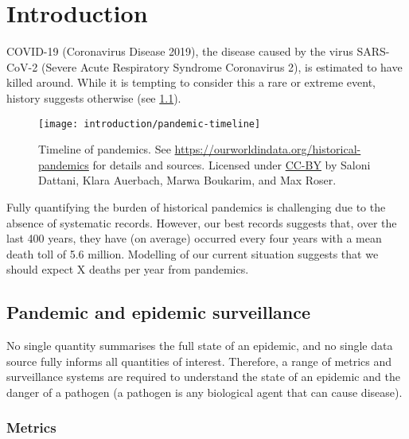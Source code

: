 \documentclass[thesis.tex]{subfiles}
\begin{document}
\chapter{Introduction} \label{intro}

COVID-19 (Coronavirus Disease 2019), the disease caused by the virus SARS-CoV-2 (Severe Acute Respiratory Syndrome Coronavirus 2), is estimated to have killed around.
While it is tempting to consider this a rare or extreme event, history suggests otherwise (see \cref{intro:fig:pandemic-timeline}).
\begin{figure}
    \texttt{[image: introduction/pandemic-timeline]}
    \caption[Timeline of pandemics.]{%
        Timeline of pandemics.
        See \url{https://ourworldindata.org/historical-pandemics} for details and sources.
        Licensed under \href{https://creativecommons.org/licenses/by/4.0/}{CC-BY} by Saloni Dattani, Klara Auerbach, Marwa Boukarim, and Max Roser.
    }
    \label{intro:fig:pandemic-timeline}
\end{figure}

Fully quantifying the burden of historical pandemics is challenging due to the absence of systematic records.
However, our best records suggests that, over the last 400 years, they have (on average) occurred every four years with a mean death toll of 5.6 million.
Modelling of our current situation suggests that we should expect X deaths per year from pandemics.

\section{Pandemic and epidemic surveillance}


No single quantity summarises the full state of an epidemic, and no single data source fully informs all quantities of interest.
Therefore, a range of metrics and surveillance systems are required to understand the state of an epidemic and the danger of a pathogen (a pathogen is any biological agent that can cause disease).

\subsection{Metrics}
\end{document}
